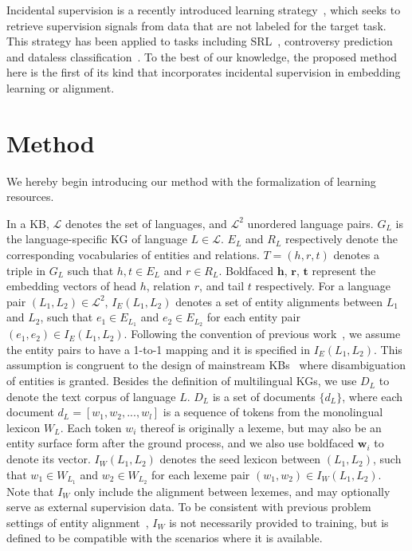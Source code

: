 \documentclass[11pt,a4paper]{article}
\newcommand{\stitle}[1]{\vspace{2ex} \noindent{\bf #1}}
\def\lang{\mathcal{L}}
\begin{document}
\stitle{Incidental supervision.}
Incidental supervision is a recently introduced learning strategy~\cite{roth2017incidental},
which seeks to retrieve supervision signals from data that are not 
labeled for 
the target task.
This strategy has been applied to tasks including SRL~\cite{he2019incidental}, controversy prediction~\cite{rethmeier2018learning} and dataless classification~\cite{song2015unsupervised}.
To the best of our knowledge, the proposed method here is the first of its kind that incorporates incidental supervision in embedding learning or alignment.

 

\section{Method}

We hereby begin introducing our method with the formalization of learning resources.

In a \mbox{KB}, $\lang$ denotes the set of languages, and $\lang^2$ unordered language pairs.
$G_{L}$ is the language-specific KG of language $L \in \lang$.
$E_{L}$ and $R_{L}$ respectively denote the corresponding vocabularies of entities and relations.
$T = (h,r,t)$ denotes a triple in $G_{L}$ such that $h, t \in E_{L}$ and $r \in R_{L}$.
Boldfaced $\mathbf{h}$, $\mathbf{r}$, $\mathbf{t}$
represent the embedding vectors of head $h$, relation $r$, and tail $t$ respectively. For a language pair
$(L_1, L_2) \in \lang^2$,
$I_E(L_1, L_2)$ denotes a set of entity alignments 
between $L_1$ and $L_2$, such that $e_1\in E_{L_1}$ and $e_2\in E_{L_2}$ for each entity pair $(e_1, e_2)\in I_E(L_1, L_2)$.
Following the convention of previous work~\cite{chen2018co,sun2018bootstrapping,yang2019aligning},
we assume the entity pairs to have a 1-to-1 mapping and it is specified in $I_E(L_1, L_2)$.
This assumption is congruent to the design of mainstream KBs~\cite{lehmann2015dbpedia,mahdisoltani2014yago3} where disambiguation of entities is granted.
Besides the definition of multilingual KGs, we use $D_L$ to denote the text corpus of language $L$.
$D_L$ is a set of documents $\{d_L\}$, where each document $d_L=[w_1, w_2, ..., w_l]$ is a sequence of tokens from the monolingual lexicon $W_L$.
Each token $w_i$ thereof is originally a lexeme, but may also be an entity surface form after the ground process, and we also use boldfaced $\mathbf{w}_i$ to denote its vector.
$I_W(L_1,L_2)$ denotes the seed lexicon between $(L_1,L_2)$, such that $w_1\in W_{L_1}$ and $w_2\in W_{L_2}$ for each lexeme pair $(w_1, w_2)\in I_W(L_1, L_2)$.
Note that $I_W$ only include the alignment between lexemes, and may optionally serve as external supervision data.
To be consistent with previous problem settings of entity alignment~\cite{chen2017multigraph,sun2018bootstrapping,yang2019aligning}, $I_W$ is not necessarily provided to training, but is defined to be compatible with the scenarios where it is available. 
\end{document}
